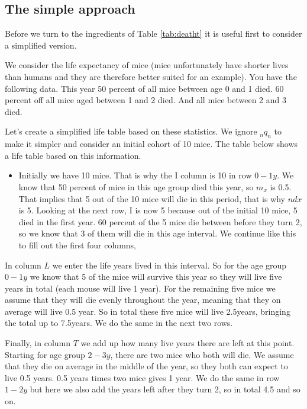 \documentclass[
]{book}
\providecommand{\tightlist}{%
  \setlength{\itemsep}{0pt}\setlength{\parskip}{0pt}}
\begin{document}
\hypertarget{the-simple-approach}{%
\subsection{The simple approach}\label{the-simple-approach}}

Before we turn to the ingredients of Table \ref{tab:deatht} it is useful first to consider a simplified version.

We consider the life expectancy of mice (mice unfortunately have shorter lives than humans and they are therefore better suited for an example). You have the following data. This year 50 percent of all mice between age 0 and 1 died. 60 percent off all mice aged between 1 and 2 died. And all mice between 2 and 3 died.

Let's create a simplified life table based on these statistics. We ignore \(_nq_n\) to make it simpler and consider an initial cohort of 10 mice. The table below shows a life table based on this information.

\begin{itemize}
\tightlist
\item
  Initially we have 10 mice. That is why the I column is 10 in row \(0-1y\). We know that 50 percent of mice in this age group died this year, so \(m_x\) is 0.5. That implies that 5 out of the 10 mice will die in this period, that is why \(ndx\) is 5. Looking at the next row, I is now 5 because out of the initial 10 mice, 5 died in the first year. 60 percent of the 5 mice die between before they turn 2, so we know that 3 of them will die in this age interval. We continue like this to fill out the first four columns,
\end{itemize}

In column \(L\) we enter the life years lived in this interval. So for the age group \(0-1y\) we know that 5 of the mice will survive this year so they will live five years in total (each mouse will live 1 year). For the remaining five mice we assume that they will die evenly throughout the year, meaning that they on average will live 0.5 year. So in total these five mice will live 2.5years, bringing the total up to 7.5years. We do the same in the next two rows.

Finally, in column \(T\) we add up how many live years there are left at this point. Starting for age group \(2-3y\), there are two mice who both will die. We assume that they die on average in the middle of the year, so they both can expect to live 0.5 years. 0.5 years times two mice gives 1 year. We do the same in row \(1-2y\) but here we also add the years left after they turn 2, so in total 4.5 and so on.
\end{document}

